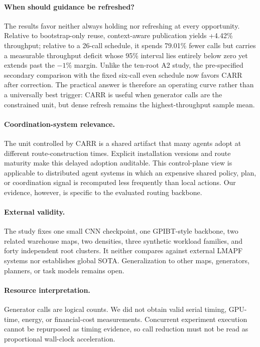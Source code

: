\documentclass[sigconf,review,anonymous]{acmart}
\newcommand{\carr}{\textsc{CARR}\xspace}
\begin{document}
\paragraph{When should guidance be refreshed?}
The results favor neither always holding nor refreshing at every opportunity.
Relative to bootstrap-only reuse, context-aware publication yields +4.42\%
throughput; relative to a 26-call schedule, it spends 79.01\% fewer calls but
carries a measurable throughput deficit whose 95\% interval lies entirely
below zero yet extends past the $-1\%$ margin. Unlike the ten-root A2 study,
the pre-specified secondary comparison with the fixed six-call even schedule
now favors \carr after correction. The practical answer is therefore an
operating curve rather than a universally best trigger: \carr is useful when
generator calls are the constrained unit, but dense refresh remains the
highest-throughput sample mean.

\paragraph{Coordination-system relevance.}
The unit controlled by \carr is a shared artifact that many agents adopt at
different route-construction times. Explicit installation versions and route
maturity make this delayed adoption auditable. This control-plane view is
applicable to distributed agent systems in which an expensive shared policy,
plan, or coordination signal is recomputed less frequently than local actions.
Our evidence, however, is specific to the evaluated routing backbone.

\paragraph{External validity.}
The study fixes one small CNN checkpoint, one GPIBT-style backbone, two related
warehouse maps, two densities, three synthetic workload families, and forty
independent root clusters. It neither compares against external LMAPF systems
nor establishes global SOTA. Generalization to other maps, generators,
planners, or task models remains open.

\paragraph{Resource interpretation.}
Generator calls are logical counts. We did not obtain valid serial timing,
GPU-time, energy, or financial-cost measurements. Concurrent experiment
execution cannot be repurposed as timing evidence, so call reduction must not
be read as proportional wall-clock acceleration.
\end{document}
